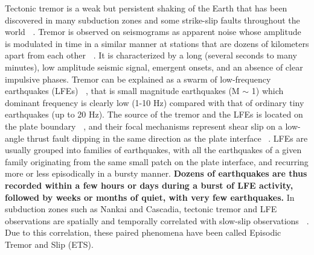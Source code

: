 \documentclass[draft]{agujournal2019}
\begin{document}
Tectonic tremor is a weak but persistent shaking of the Earth that has been discovered in many subduction zones and some strike-slip faults throughout the world \textbf{~\cite{BER_2011}}. Tremor is observed on seismograms as apparent noise whose amplitude is modulated in time in a similar manner at stations that are dozens of kilometers apart from each other \textbf{~\cite{OBA_2002}}. It is characterized by a long (several seconds to many minutes), low amplitude seismic signal, emergent onsets, and an absence of clear impulsive phases. Tremor can be explained as a swarm of low-frequency earthquakes (LFEs) \textbf{~\cite{SHE_2007_nature}}, that is small magnitude earthquakes (M $\sim$ 1) which dominant frequency is clearly low (1-10 Hz) compared with that of ordinary tiny earthquakes (up to 20 Hz). The source of the tremor and the LFEs is located on the plate boundary \textbf{~\cite{SHE_2006,BOS_2012,AUD_2016}}, and their focal mechanisms represent shear slip on a low-angle thrust fault dipping in the same direction as the plate interface ~\textbf{\cite{IDE_2007_GRL,BOS_2012,ROY_2014}}. LFEs are usually grouped into families of earthquakes, with all the earthquakes of a given family originating from the same small patch on the plate interface, and recurring more or less episodically in a bursty manner. \textbf{Dozens of earthquakes are thus recorded within a few hours or days during a burst of LFE activity, followed by weeks or months of quiet, with very few earthquakes.} In subduction zones such as Nankai and Cascadia, tectonic tremor and LFE observations are spatially and temporally correlated with slow-slip observations \textbf{~\cite{ROG_2003,OBA_2004}}. Due to this correlation, these paired phenomena have been called Episodic Tremor and Slip (ETS). \\
\end{document}
